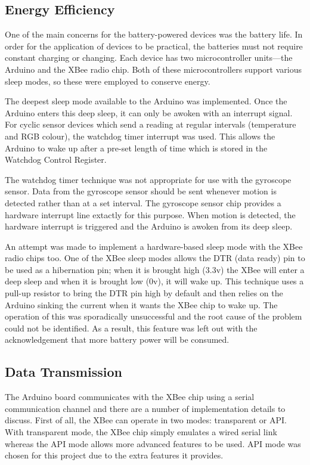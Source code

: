     \subsection{Energy Efficiency}
      One of the main concerns for the battery-powered devices was the battery life. In order for the application of devices to be practical, the batteries must not require constant charging or changing. Each device has two microcontroller units---the Arduino and the XBee radio chip. Both of these microcontrollers support various sleep modes, so these were employed to conserve energy.

      The deepest sleep mode available to the Arduino was implemented. Once the Arduino enters this deep sleep, it can only be awoken with an interrupt signal. For cyclic sensor devices which send a reading at regular intervals (temperature and RGB colour), the watchdog timer interrupt was used. This allows the Arduino to wake up after a pre-set length of time which is stored in the Watchdog Control Register.

      The watchdog timer technique was not appropriate for use with the gyroscope sensor. Data from the gyroscope sensor should be sent whenever motion is detected rather than at a set interval. The gyroscope sensor chip provides a hardware interrupt line extactly for this purpose. When motion is detected, the hardware interrupt is triggered and the Arduino is awoken from its deep sleep.

      An attempt was made to implement a hardware-based sleep mode with the XBee radio chips too. One of the XBee sleep modes allows the DTR (data ready) pin to be used as a hibernation pin; when it is brought high (3.3v) the XBee will enter a deep sleep and when it is brought low (0v), it will wake up. This technique uses a pull-up resistor to bring the DTR pin high by default and then relies on the Arduino sinking the current when it wants the XBee chip to wake up. The operation of this was sporadically unsuccessful and the root cause of the problem could not be identified. As a result, this feature was left out with the acknowledgement that more battery power will be consumed.

    \subsection{Data Transmission}
    \label{section:data-transmission}
      The Arduino board communicates with the XBee chip using a serial communication channel and there are a number of implementation details to discuss. First of all, the XBee can operate in two modes: transparent or API. With transparent mode, the XBee chip simply emulates a wired serial link whereas the API mode allows more advanced features to be used. API mode was chosen for this project due to the extra features it provides.

